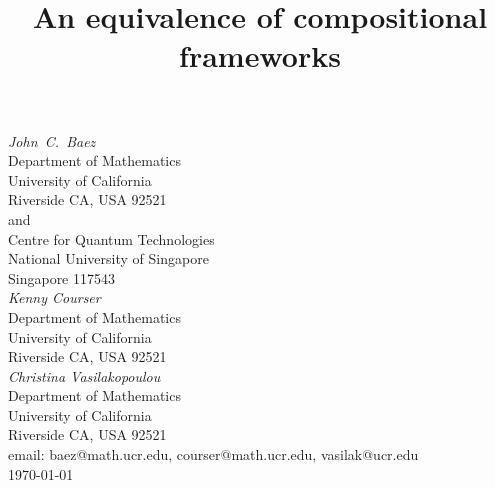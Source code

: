 \documentclass{amsart}
\title{An equivalence of compositional frameworks}
\begin{document}
\maketitle

\begin{center}   
  \vspace{0.3cm}
  {\em John\ C.\ Baez \\}
  \vspace{0.3cm}
  {\small
 Department of Mathematics \\
    University of California \\
  Riverside CA, USA 92521 \\ and \\
 Centre for Quantum Technologies  \\
  National University of Singapore \\
    Singapore 117543  \\    } 
 \vspace{0.4cm}
{\em Kenny Courser \\}
\vspace{0.3cm}
   {\small
  Department of Mathematics \\
  University of California \\
  Riverside CA, USA 92521 \\}
  \vspace{0.4cm}   
{\em Christina Vasilakopoulou \\}
\vspace{0.3cm}
   {\small
  Department of Mathematics \\
  University of California \\
  Riverside CA, USA 92521 \\}
  \vspace{0.3cm}   
  {\small email: baez@math.ucr.edu, courser@math.ucr.edu, vasilak@ucr.edu\\} 
  \vspace{0.3cm}   
  {\small \today}
  \vspace{0.3cm}   
\end{center}   
\end{document}
